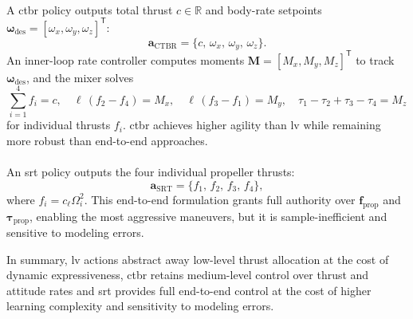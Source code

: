 \paragraph{}  
A \gls{ctbr} policy outputs total thrust \(c\in\mathbb{R}\) and body-rate setpoints \(\boldsymbol{\omega}_{\mathrm{des}}=[\omega_x,\omega_y,\omega_z]^\mathsf{T}\):
\begin{equation}
\mathbf{a}_{\mathrm{CTBR}} = \{c,\,\omega_x,\,\omega_y,\,\omega_z\}.
\end{equation}
An inner-loop rate controller computes moments \(\mathbf{M}=[M_x,M_y,M_z]^\mathsf{T}\) to track \(\boldsymbol{\omega}_{\mathrm{des}}\), and the mixer solves
\begin{equation}
\sum_{i=1}^4 f_i = c, 
\quad
\ell\,(f_2 - f_4) = M_x, 
\quad
\ell\,(f_3 - f_1) = M_y, 
\quad
\tau_1 - \tau_2 + \tau_3 - \tau_4 = M_z
\end{equation}
for individual thrusts \(f_i\). \gls{ctbr} achieves higher agility than \gls{lv} while remaining more robust than end-to-end approaches.

\paragraph{}
An \gls{srt} policy outputs the four individual propeller thrusts:
\begin{equation}
\mathbf{a}_{\mathrm{SRT}} = \{f_1,\,f_2,\,f_3,\,f_4\},
\end{equation}
where \(f_i = c_\ell \Omega_i^2\). This end-to-end formulation grants full authority over \(\mathbf{f}_{\mathrm{prop}}\) and \(\boldsymbol{\tau}_{\mathrm{prop}}\), enabling the most aggressive maneuvers, but it is sample-inefficient and sensitive to modeling errors.

In summary, \gls{lv} actions abstract away low-level thrust allocation at the cost of dynamic expressiveness, \gls{ctbr} retains medium-level control over thrust and attitude rates and \gls{srt} provides full end-to-end control at the cost of higher learning complexity and sensitivity to modeling errors.
